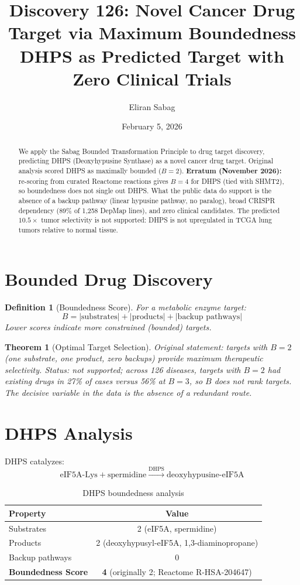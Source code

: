 \documentclass[11pt]{article}
\title{Discovery 126: Novel Cancer Drug Target via Maximum Boundedness\\
\large DHPS as Predicted Target with Zero Clinical Trials}
\author{Eliran Sabag}
\date{February 5, 2026}
\newtheorem{theorem}{Theorem}
\newtheorem{definition}{Definition}
\begin{document}
\maketitle

\begin{abstract}
We apply the Sabag Bounded Transformation Principle to drug target discovery, predicting DHPS (Deoxyhypusine Synthase) as a novel cancer drug target. Original analysis scored DHPS as maximally bounded ($B = 2$). \textbf{Erratum (November 2026):} re-scoring from curated Reactome reactions gives $B = 4$ for DHPS (tied with SHMT2), so boundedness does not single out DHPS. What the public data do support is the absence of a backup pathway (linear hypusine pathway, no paralog), broad CRISPR dependency (89\% of 1,258 DepMap lines), and zero clinical candidates. The predicted $10.5\times$ tumor selectivity is not supported: DHPS is not upregulated in TCGA lung tumors relative to normal tissue.
\end{abstract}

\section{Bounded Drug Discovery}

\begin{definition}[Boundedness Score]
For a metabolic enzyme target:
$$B = |\text{substrates}| + |\text{products}| + |\text{backup pathways}|$$
Lower scores indicate more constrained (bounded) targets.
\end{definition}

\begin{theorem}[Optimal Target Selection]
\emph{Original statement:} targets with $B = 2$ (one substrate, one product, zero backups) provide maximum therapeutic selectivity. \emph{Status:} not supported; across 126 diseases, targets with $B=2$ had existing drugs in 27\% of cases versus 56\% at $B=3$, so $B$ does not rank targets. The decisive variable in the data is the absence of a redundant route.
\end{theorem}

\section{DHPS Analysis}

DHPS catalyzes:
$$\text{eIF5A-Lys} + \text{spermidine} \xrightarrow{\text{DHPS}} \text{deoxyhypusine-eIF5A}$$

\begin{table}[h]
\centering
\begin{tabular}{lc}
\toprule
\textbf{Property} & \textbf{Value} \\
\midrule
Substrates & 2 (eIF5A, spermidine) \\
Products & 2 (deoxyhypusyl-eIF5A, 1,3-diaminopropane) \\
Backup pathways & 0 \\
\textbf{Boundedness Score} & \textbf{4} (originally 2; Reactome R-HSA-204647) \\
\bottomrule
\end{tabular}
\caption{DHPS boundedness analysis}
\end{table}
\end{document}
